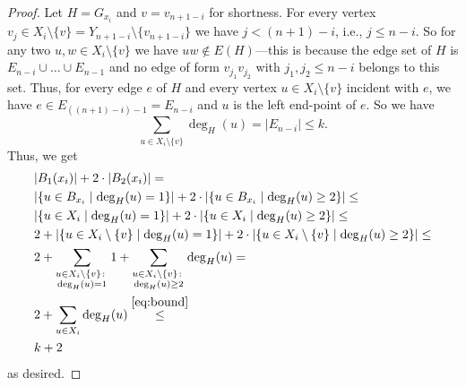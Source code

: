 \documentclass[a4paper,UKenglish,cleveref, autoref, thm-restate]{lipics-v2021}
\begin{document}
\begin{proof}
	Let $H = G_{x_i}$ and $v = v_{n+1-i}$ for shortness.
	For every vertex $v_j \in X_i \setminus \{v\} = Y_{n+1-i} \setminus \{v_{n+1-i}\}$ we have $j < (n+1)-i$, i.e., $j \leq n - i$.
	So for any two $u,w \in X_i \setminus \{v\}$ we have $uw \notin E(H)$---this is because the edge set of $H$ is $E_{n-i} \cup \dots \cup E_{n-1}$ and no edge of form $v_{j_1} v_{j_2}$ with $j_1, j_2 \leq n-i$ belongs to this set.
	Thus, for every edge $e$ of $H$ and every vertex $u \in X_i \setminus \{v\}$ incident with $e$, we have $e \in E_{((n+1)-i)-1} = E_{n-i}$ and $u$ is the left end-point of $e$.
		So we have 
		\begin{equation}\label{eq:bound}
			\sum_{u \in X_i \setminus \{v\}} \deg_H(u) = |E_{n-i}| \leq k.
		\end{equation}
		Thus, we get
		\begin{align*}
			&|B_1(x_i)| + 2 \cdot |B_2(x_i)| = \\
			&|\{u \in B_{x_i} \mid \deg_{H}(u) = 1\}| + 2\cdot |\{u \in B_{x_i} \mid \deg_{H}(u) \geq 2\}| \leq \\
			&|\{u \in X_i \mid \deg_{H}(u) = 1\}| + 2\cdot |\{u \in X_i \mid \deg_{H}(u) \geq 2\}| \leq \\
			&2 + |\{u \in X_i \setminus \{v\} \mid \deg_H(u) = 1\}| + 2\cdot|\{u \in X_i \setminus \{v\} \mid \deg_H(u) \geq 2\}| \leq \\
			&2 +\sum_{\substack{u \in X_i \setminus \{v\} \colon \\ \deg_H(u) = 1}} 1 + \sum_{\substack{u \in X_i \setminus \{v\} \colon \\ \deg_H(u) \geq 2}} \deg_H(u) = \\
			&2 + \sum_{u \in X_i} \deg_H(u) \stackrel{\eqref{eq:bound}}{\leq} \\
			&k + 2
		\end{align*}
		as desired.
		

\end{proof}
\end{document}
